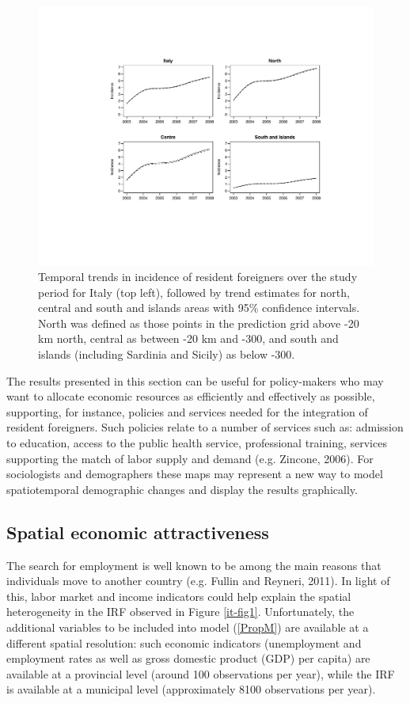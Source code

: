 \begin{figure}[tbp]
	\centering
		\includegraphics[width=\textwidth]{it/trends.pdf}
	\caption{Temporal trends in incidence of resident foreigners over the study period for Italy (top left), followed by trend estimates for north, central and south and islands areas with 95\% confidence intervals. North was defined as those points in the prediction grid above -20 km north, central as between -20 km and -300, and south and islands (including Sardinia and Sicily) as below -300.}
	\label{trends}
\end{figure}

The results presented in this section can be useful for policy-makers who may want to allocate economic resources as efficiently and effectively as possible, supporting, for instance, policies and services needed for the integration of resident foreigners. Such policies relate to a number of services such as: admission to education, access to the public health service, professional training, services supporting the match of labor supply and demand (e.g. Zincone, 2006). For sociologists and demographers these maps may represent a new way to model spatiotemporal demographic changes and display the results graphically. 

\subsection{Spatial economic attractiveness \label{diss}}

The search for employment is well known to be among the main reasons that individuals move to another country (e.g. Fullin and Reyneri, 2011). In light of this, labor market and income indicators could help explain the spatial heterogeneity in the IRF observed in Figure \ref{it-fig1}. Unfortunately, the additional variables to be included into model (\ref{PropM}) are available at a different spatial resolution: such economic indicators (unemployment and employment rates as well as gross domestic product (GDP) per capita) are available at a provincial level (around 100 observations per year), while the IRF is available at a municipal level (approximately 8100 observations per year). 

